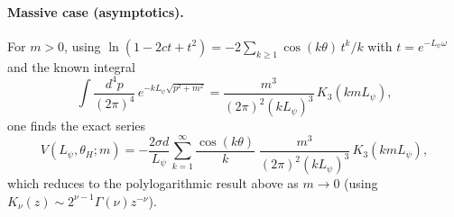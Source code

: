 \documentclass[12pt]{article}
\begin{document}
\paragraph{Massive case (asymptotics).}
For $m>0$, using $\ln(1-2ct+t^2)= -2\sum_{k\ge 1} \cos(k\theta)\, t^k/k$ with $t=e^{-L_\psi \omega}$ and the known integral
\begin{equation}
\int \!\frac{d^4p}{(2\pi)^4}\, e^{-k L_\psi \sqrt{p^2 + m^2}}
= \frac{m^3}{(2\pi)^2 (k L_\psi)^3}\, K_3(k m L_\psi),
\end{equation}
one finds the exact series
\begin{equation}
V(L_\psi,\theta_H;m)
= - \frac{2\sigma d}{L_\psi} \sum_{k=1}^\infty \frac{\cos(k\theta)}{k}\;
\frac{m^3}{(2\pi)^2 (k L_\psi)^3}\, K_3(k m L_\psi),
\end{equation}
which reduces to the polylogarithmic result above as $m\to 0$ (using $K_\nu(z)\sim 2^{\nu-1}\Gamma(\nu) z^{-\nu}$).
\end{document}
